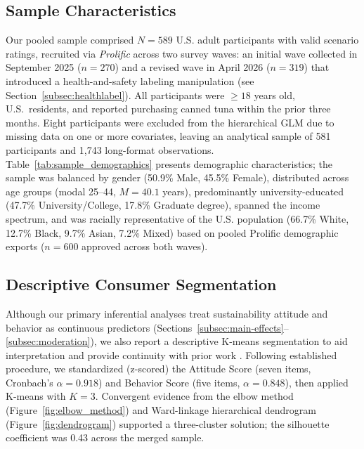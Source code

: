 \subsection{Sample Characteristics}\label{subsec:sample}

Our pooled sample comprised $N=589$ U.S. adult participants with valid scenario ratings, recruited via \textit{Prolific} across two survey waves: an initial wave collected in September 2025 ($n=270$) and a revised wave in April 2026 ($n=319$) that introduced a health-and-safety labeling manipulation (see Section~\ref{subsec:healthlabel}). All participants were $\geq18$ years old, U.S.\ residents, and reported purchasing canned tuna within the prior three months. Eight participants were excluded from the hierarchical GLM due to missing data on one or more covariates, leaving an analytical sample of 581 participants and 1{,}743 long-format observations. Table~\ref{tab:sample_demographics} presents demographic characteristics; the sample was balanced by gender (50.9\% Male, 45.5\% Female), distributed across age groups (modal 25--44, $M=40.1$ years), predominantly university-educated (47.7\% University/College, 17.8\% Graduate degree), spanned the income spectrum, and was racially representative of the U.S. population (66.7\% White, 12.7\% Black, 9.7\% Asian, 7.2\% Mixed) based on pooled Prolific demographic exports ($n=600$ approved across both waves).



\subsection{Descriptive Consumer Segmentation}\label{subsec:segments}

Although our primary inferential analyses treat sustainability attitude and behavior as continuous predictors (Sections~\ref{subsec:main-effects}--\ref{subsec:moderation}), we also report a descriptive K-means segmentation to aid interpretation and provide continuity with prior work \citep{theisz2025}. Following established procedure, we standardized (z-scored) the Attitude Score (seven items, Cronbach's $\alpha=0.918$) and Behavior Score (five items, $\alpha=0.848$), then applied K-means with $K=3$. Convergent evidence from the elbow method (Figure~\ref{fig:elbow_method}) and Ward-linkage hierarchical dendrogram (Figure~\ref{fig:dendrogram}) supported a three-cluster solution; the silhouette coefficient was 0.43 across the merged sample.


